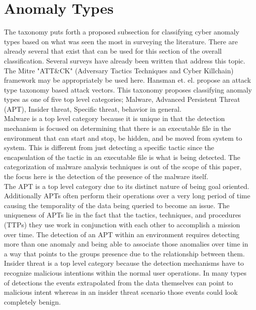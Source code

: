 \documentclass[10pt]{IEEEtran}
\begin{document}
\section{Anomaly Types}
The taxonomy puts forth a proposed subsection for classifying cyber anomaly types based on what was seen the most in surveying the literature. There are already several that exist that can be used for this section of the overall classification. Several surveys have already been written that address this topic. The Mitre "ATT\&CK" (Adversary Tactics Techniques and Cyber Killchain) framework may be appropriately be used here\cite{lazarevic2005intrusion}\cite{mitchell2014survey}\cite{axelsson2000intrusion}. Hansman et. el. propose an attack type taxonomy based attack vectors\cite{hansman2005taxonomy}.
This taxonomy proposes classifying anomaly types as one of five top level categories; Malware, Advanced Persistent Threat (APT), Insider threat, Specific threat, behavior in general. \\
Malware is a top level category because it is unique in that the detection mechanism is focused on determining that there is an executable file in the environment that can start and stop, be hidden, and be moved from system to system. This is different from just detecting a specific tactic since the encapsulation of the tactic in an executable file is what is being detected. The categorization of malware analysis techniques is out of the scope of this paper, the focus here is the detection of the presence of the malware itself. \\
The APT is a top level category due to its distinct nature of being goal oriented. Additionally APTs often perform their operations over a very long period of time causing the temporality of the data being queried to become an issue.  The uniqueness of APTs lie in the fact that the tactics, techniques, and procedures (TTPs) they use work in conjunction with each other to accomplish a mission over time. The detection of an APT within an environment requires detecting more than one anomaly and being able to associate those anomalies over time in a way that points to the groups presence due to the relationship between them. \\
Insider threat is a top level category because the detection mechanisms have to recognize malicious intentions within the normal user operations. In many types of detections the events extrapolated from the data themselves can point to malicious intent whereas in an insider threat scenario those events could look completely benign.\\
\end{document}
